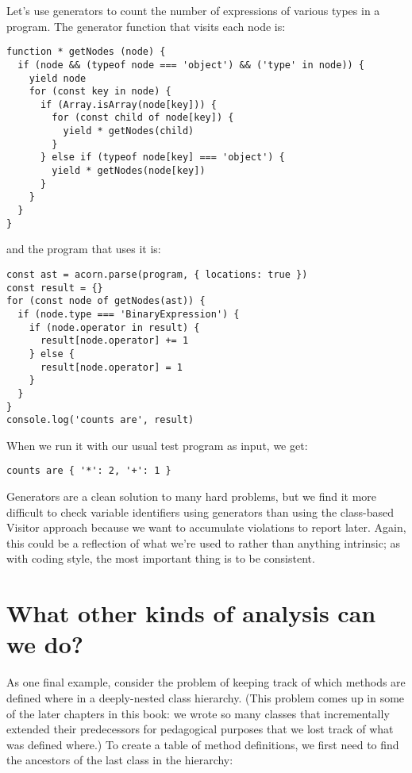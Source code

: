 \documentclass[krantzl]{krantz}
\begin{document}
Let’s use generators to count the number of expressions of various types in a program.
The generator function that visits each node is:


\begin{lstlisting}[frame=tblr]
function * getNodes (node) {
  if (node && (typeof node === 'object') && ('type' in node)) {
    yield node
    for (const key in node) {
      if (Array.isArray(node[key])) {
        for (const child of node[key]) {
          yield * getNodes(child)
        }
      } else if (typeof node[key] === 'object') {
        yield * getNodes(node[key])
      }
    }
  }
}
\end{lstlisting}



\noindent and the program that uses it is:


\begin{lstlisting}[frame=tblr]
const ast = acorn.parse(program, { locations: true })
const result = {}
for (const node of getNodes(ast)) {
  if (node.type === 'BinaryExpression') {
    if (node.operator in result) {
      result[node.operator] += 1
    } else {
      result[node.operator] = 1
    }
  }
}
console.log('counts are', result)
\end{lstlisting}



When we run it with our usual test program as input, we get:


\begin{lstlisting}[frame=tblr,backgroundcolor=\color{black!5}]
counts are { '*': 2, '+': 1 }
\end{lstlisting}



Generators are a clean solution to many hard problems,
but we find it more difficult to check variable identifiers using generators
than using the class-based Visitor approach
because we want to accumulate violations to report later.
Again,
this could be a reflection of what we’re used to rather than anything intrinsic;
as with coding style,
the most important thing is to be consistent.

\section{What other kinds of analysis can we do?}\label{style-checker-analysis}


As one final example,
consider the problem of keeping track of which methods are defined where
in a deeply-nested class hierarchy.
(This problem comes up in some of the later chapters in this book:
we wrote so many classes that incrementally extended their predecessors for pedagogical purposes
that we lost track of what was defined where.)
To create a table of method definitions,
we first need to find the ancestors of the last class in the hierarchy:
\end{document}
